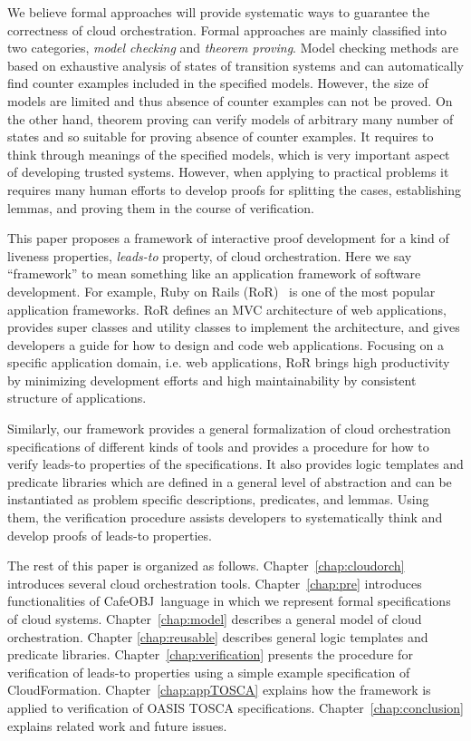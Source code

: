 \documentclass[12pt]{report}
\newcommand{\cafeobj}{{\sf CafeOBJ}~}
\begin{document}
We believe formal approaches will provide systematic ways to guarantee
the correctness of cloud orchestration. Formal approaches are mainly
classified into two categories, {\it model checking} and {\it theorem
  proving}. Model checking methods are based on exhaustive analysis of
states of transition systems and can automatically find counter
examples included in the specified models. However, the size of models
are limited and thus absence of counter examples can not be proved.
On the other hand, theorem proving can verify models of arbitrary many
number of states and so suitable for proving absence of counter
examples. It requires to think through meanings of the specified
models, which is very important aspect of developing trusted
systems. However, when applying to practical problems it requires many
human efforts to develop proofs for splitting the cases, establishing
lemmas, and proving them in the course of verification.

This paper proposes a framework of interactive proof development for a
kind of liveness properties, {\it leads-to} property, of cloud
orchestration. Here we say ``framework'' to mean something like an
application framework of software development. For example, Ruby on
Rails (RoR)~\cite{RoR} is one of the most popular application
frameworks. RoR defines an MVC architecture of web applications,
provides super classes and utility classes to implement the
architecture, and gives developers a guide for how to design and code
web applications. Focusing on a specific application domain, i.e. web
applications, RoR brings high productivity by minimizing development
efforts and high maintainability by consistent structure of
applications.

Similarly, our framework provides a general formalization of cloud
orchestration specifications of different kinds of tools and provides
a procedure for how to verify leads-to properties of the
specifications. It also provides logic templates and predicate
libraries which are defined in a general level of abstraction and can
be instantiated as problem specific descriptions, predicates,
and lemmas. Using them, the verification procedure assists developers
to systematically think and develop proofs of leads-to properties.

The rest of this paper is organized as
follows. Chapter~\ref{chap:cloudorch} introduces several cloud
orchestration tools. Chapter~\ref{chap:pre} introduces functionalities
of \cafeobj language in which we represent formal specifications of
cloud systems. Chapter~\ref{chap:model} describes a general model of
cloud orchestration. Chapter \ref{chap:reusable} describes general
logic templates and predicate
libraries. Chapter~\ref{chap:verification} presents the procedure for
verification of leads-to properties using a simple example
specification of CloudFormation. Chapter~\ref{chap:appTOSCA} explains
how the framework is applied to verification of OASIS TOSCA
specifications.  Chapter~\ref{chap:conclusion} explains related work
and future issues.
\end{document}
